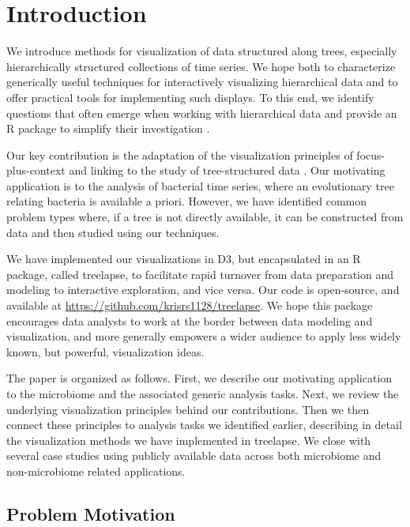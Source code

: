 \documentclass[12pt]{article}
\begin{document}
\newpage
{} %

\section{Introduction}\label{introduction}

We introduce methods for visualization of data structured along trees,
especially hierarchically structured collections of time series. We hope both to
characterize generically useful techniques for interactively visualizing
hierarchical data and to offer practical tools for implementing such displays.
To this end, we identify questions that often emerge when working with
hierarchical data and provide an R package to simplify their investigation
\citep{ihaka1996r}.

Our key contribution is the adaptation of the visualization principles of
focus-plus-context and linking to the study of tree-structured data
\citep{buja1996interactive, becker1987brushing}. Our motivating application is
to the analysis of bacterial time series, where an evolutionary tree relating
bacteria is available a priori. However, we have identified common problem types
where, if a tree is not directly available, it can be constructed from data and
then studied using our techniques.

We have implemented our visualizations in D3, but encapsulated in an R package,
called treelapse, to facilitate rapid turnover from data preparation and
modeling to interactive exploration, and vice versa. Our code is open-source,
and available at \url{https://github.com/krisrs1128/treelapse}. We hope this
package encourages data analysts to work at the border between data modeling and
visualization, and more generally empowers a wider audience to apply less widely
known, but powerful, visualization ideas.

The paper is organized as follows. First, we describe our motivating application
to the microbiome and the associated generic analysis tasks. Next, we review the
underlying visualization principles behind our contributions. Then we then
connect these principles to analysis tasks we identified earlier, describing in
detail the visualization methods we have implemented in treelapse. We close with
several case studies using publicly available data across both microbiome and
non-microbiome related applications.

\subsection{Problem Motivation}\label{problem-motivation}
\end{document}
